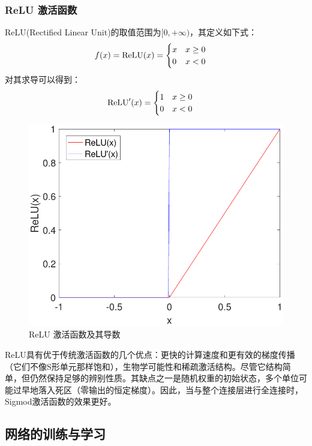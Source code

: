\subsubsection{ReLU 激活函数}

ReLU(Rectified Linear Unit)的取值范围为$[0,+\infty)$，其定义如下式：
\begin{align}
f(x)&={\rm ReLU}(x)=\begin{cases}
      x & x\geq 0 \\
      0& x<0
   \end{cases}\;
\end{align}
对其求导可以得到：
\begin{align}
{\rm ReLU}'(x)&=\begin{cases}
      1 & x\geq 0 \\
      0 & x<0
   \end{cases}\;
\end{align}

\begin{figure}[!t]
	\centering
	\includegraphics[width=\textwidth]{figures/networks/ReLU}
	\caption{ReLU 激活函数及其导数}
	\label{fig:ReLU}
\end{figure}

ReLU具有优于传统激活函数的几个优点：更快的计算速度和更有效的梯度传播（它们不像S形单元那样饱和），生物学可能性和稀疏激活结构。尽管它结构简单，但仍然保持足够的辨别性质。其缺点之一是随机权重的初始状态，多个单位可能过早地落入死区（零输出的恒定梯度）。因此，当与整个连接层进行全连接时，Sigmod激活函数的效果更好。

\subsection{网络的训练与学习}

